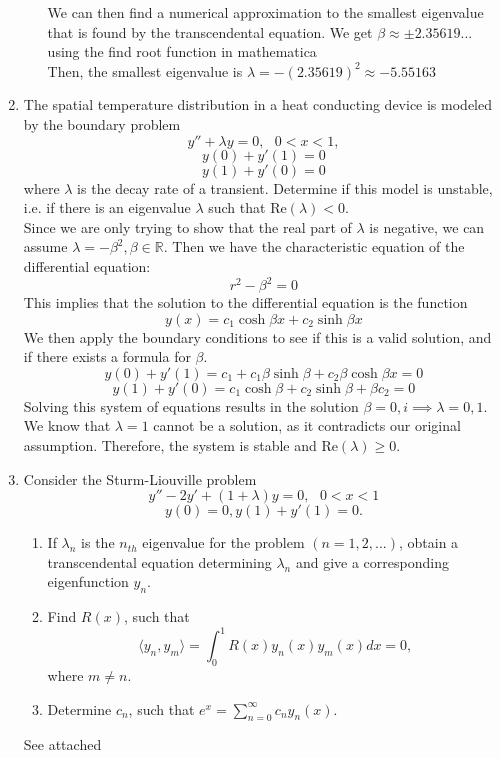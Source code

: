 \documentclass[12pt]{article}
\numberwithin{equation}{section}
\begin{document}
\begin{enumerate}
\begin{enumerate}
            We can then find a numerical approximation to the smallest eigenvalue that is found by the transcendental equation. We get $\beta \approx \pm 2.35619...$ using the find root function in mathematica \\
            Then, the smallest eigenvalue is $\lambda=-(2.35619)^2\approx -5.55163$
        \end{enumerate}
    \item The spatial temperature distribution in a heat conducting device is modeled by the boundary problem
        $$y''+\lambda y=0,\text{   }0<x<1,$$
        $$y(0)+y'(1)=0$$
        $$y(1)+y'(0)=0$$
        where $\lambda$ is the decay rate of a transient. Determine if this model is unstable, i.e. if there is an eigenvalue $\lambda$ such that $\mathrm{Re}(\lambda)<0$.\\
        Since we are only trying to show that the real part of $\lambda$ is negative, we can assume $\lambda=-\beta^2,\beta\in\mathbb{R}$. Then we have the characteristic equation of the differential equation:
        $$r^2-\beta^2=0$$
        This implies that the solution to the differential equation is the function
        $$y(x)=c_1\cosh{\beta x}+c_2\sinh{\beta x}$$
        We then apply the boundary conditions to see if this is a valid solution, and if there exists a formula for $\beta$.
        $$y(0)+y'(1)=c_1+c_1\beta\sinh{\beta}+c_2\beta\cosh{\beta x}=0$$
        $$y(1)+y'(0)=c_1\cosh{\beta}+c_2\sinh{\beta}+\beta c_2=0$$
        Solving this system of equations results in the solution $\beta=0,i\implies \lambda=0,1$. We know that $\lambda=1$ cannot be a solution, as it contradicts our original assumption. Therefore, the system is stable and $\mathrm{Re}(\lambda)\geq 0$.
    \item Consider the Sturm-Liouville problem
        $$y''-2y'+(1+\lambda)y=0,\text{  }0<x<1$$
        $$y(0)=0,y(1)+y'(1)=0.$$
        \begin{enumerate}
            \item If $\lambda_n$ is the $n_{th}$ eigenvalue for the problem $(n=1,2,...)$, obtain a transcendental equation determining $\lambda_n$ and give a corresponding eigenfunction $y_n$.\\

            \item Find $R(x)$, such that
                $$\langle y_n,y_m\rangle=\int_0^1 R(x)y_n(x)y_m(x)dx=0,$$
                where $m\neq n$.
            \item Determine $c_n$, such that $e^x=\sum_{n=0}^\infty c_ny_n(x).$
        \end{enumerate}
        See attached


\end{enumerate}
\end{document}
